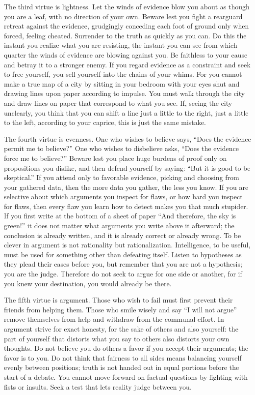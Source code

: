 {
 The third virtue is lightness. Let the winds of evidence blow you
about as though you are a leaf, with no direction of your own. Beware
lest you fight a rearguard retreat against the evidence, grudgingly
conceding each foot of ground only when forced, feeling cheated.
Surrender to the truth as quickly as you can. Do this the instant you
realize what you are resisting, the instant you can see from which
quarter the winds of evidence are blowing against you. Be faithless to
your cause and betray it to a stronger enemy. If you regard evidence as
a constraint and seek to free yourself, you sell yourself into the
chains of your whims. For you cannot make a true map of a city by
sitting in your bedroom with your eyes shut and drawing lines upon
paper according to impulse. You must walk through the city and draw
lines on paper that correspond to what you see. If, seeing the city
unclearly, you think that you can shift a line just a little to the
right, just a little to the left, according to your caprice, this is
just the same mistake.}

{
 The fourth virtue is evenness. One who wishes to believe says,
``Does the evidence permit me to
believe?'' One who wishes to disbelieve asks,
``Does the evidence force me to
believe?'' Beware lest you place huge burdens of
proof only on propositions you dislike, and then defend yourself by
saying: ``But it is good to be
skeptical.'' If you attend only to favorable
evidence, picking and choosing from your gathered data, then the more
data you gather, the less you know. If you are selective about which
arguments you inspect for flaws, or how hard you inspect for flaws,
then every flaw you learn how to detect makes you that much stupider.
If you first write at the bottom of a sheet of paper
``And therefore, the sky is green!''
it does not matter what arguments you write above it afterward; the
conclusion is already written, and it is already correct or already
wrong. To be clever in argument is not rationality but rationalization.
Intelligence, to be useful, must be used for something other than
defeating itself. Listen to hypotheses as they plead their cases before
you, but remember that you are not a hypothesis; you are the judge.
Therefore do not seek to argue for one side or another, for if you knew
your destination, you would already be there.}

{
 The fifth virtue is argument. Those who wish to fail must first
prevent their friends from helping them. Those who smile wisely and say
``I will not argue'' remove
themselves from help and withdraw from the communal effort. In argument
strive for exact honesty, for the sake of others and also yourself: the
part of yourself that distorts what you say to others also distorts
your own thoughts. Do not believe you do others a favor if you accept
their arguments; the favor is to you. Do not think that fairness to all
sides means balancing yourself evenly between positions; truth is not
handed out in equal portions before the start of a debate. You cannot
move forward on factual questions by fighting with fists or insults.
Seek a test that lets reality judge between you.}

